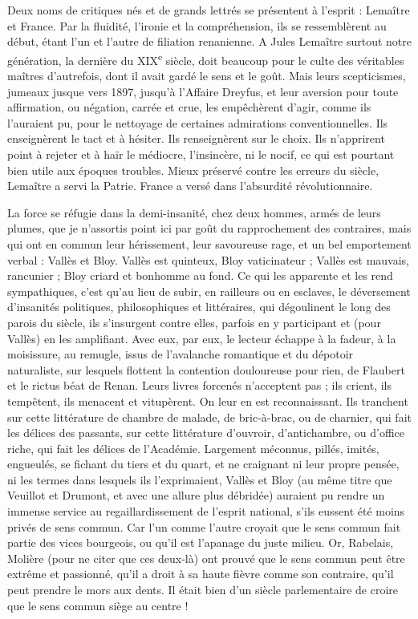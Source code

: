 \documentclass[french,twoside]{book} %
\begin{document}
Deux noms de critiques nés et de grands lettrés se présentent à l’esprit : Lemaître et France. Par la fluidité, l’ironie et la compréhension, ils se ressemblèrent au début, étant l’un et l’autre de filiation renanienne. A Jules Lemaître surtout notre génération, la dernière du XIX\textsuperscript{e} siècle, doit beaucoup pour le culte des véritables maîtres d’autrefois, dont il avait gardé le sens et le goût. Mais leurs scepticismes, jumeaux jusque vers 1897, jusqu’à l’Affaire Dreyfus, et leur aversion pour toute affirmation, ou négation, carrée et crue, les empêchèrent d’agir, comme ils l’auraient pu, pour le nettoyage de certaines admirations conventionnelles. Ils enseignèrent le tact et à hésiter. Ils renseignèrent sur le choix. Ils n’apprirent point à rejeter et à haïr le médiocre, l’insincère, ni le nocif, ce qui est pourtant bien utile aux époques troubles. Mieux préservé contre les erreurs du siècle, Lemaître a servi la Patrie. France a versé dans l’absurdité révolutionnaire.\par
La force se réfugie dans la demi-insanité, chez deux hommes, armés de leurs plumes, que je n’assortis point ici par goût du rapprochement des contraires, mais qui ont en commun leur hérissement, leur savoureuse rage, et un bel emportement verbal : Vallès et Bloy. Vallès est quinteux, Bloy vaticinateur ; Vallès est mauvais, rancunier ; Bloy criard et bonhomme au fond. Ce qui les apparente et les rend sympathiques, c’est qu’au lieu de subir, en railleurs ou en esclaves, le déversement d’insanités politiques, philosophiques et littéraires, qui dégoulinent le long des parois du siècle, ils s’insurgent contre elles, parfois en y participant et (pour Vallès) en les amplifiant. Avec eux, par eux, le lecteur échappe à la fadeur, à la moisissure, au remugle, issus de l’avalanche romantique et du dépotoir naturaliste, sur lesquels flottent la contention douloureuse pour rien, de Flaubert et le rictus béat de Renan. Leurs livres forcenés n’acceptent pas ; ils crient, ils tempêtent, ils menacent et vitupèrent. On leur en est reconnaissant. Ils tranchent sur cette littérature de chambre de malade, de bric-à-brac, ou de charnier, qui fait les délices des passants, sur cette littérature d’ouvroir, d’antichambre, ou d’office riche, qui fait les délices de l’Académie. Largement méconnus, pillés, imités, engueulés, se fichant du tiers et du quart, et ne craignant ni leur propre pensée, ni les termes dans lesquels ils l’exprimaient, Vallès et Bloy (au même titre que Veuillot et Drumont, et avec une allure plus débridée) auraient pu rendre un immense service au regaillardissement de l’esprit national, s’ils eussent été moins privés de sens commun. Car l’un comme l’autre croyait que le sens commun fait partie des vices bourgeois, ou qu’il est l’apanage du juste milieu. Or, Rabelais, Molière (pour ne citer que ces deux-là) ont prouvé que le sens commun peut être extrême et passionné, qu’il a droit à sa haute fièvre comme son contraire, qu’il peut prendre le mors aux dents. Il était bien d’un siècle parlementaire de croire que le sens commun siège au centre !\par
\end{document}
